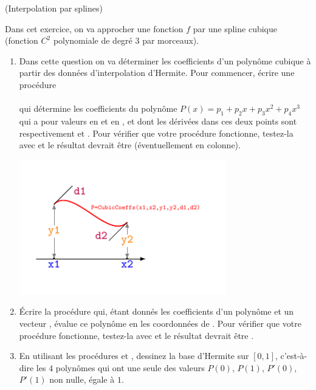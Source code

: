 \documentclass[a4paper,12pt,reqno]{amsart}
\begin{document}
\newpage
\begin{exo} (Interpolation par splines)

  Dans cet exercice, on va approcher une fonction $f$ par une spline cubique (fonction $C^{2}$ polynomiale de degré $3$ par morceaux).
  \begin{enumerate}
    \item Dans cette question on va déterminer les coefficients d'un polynôme cubique à partir des données d'interpolation d'Hermite. Pour commencer, écrire une procédure\\
    \indent {}\\
    qui détermine les coefficients  du polynôme $P(x)= p_{1}+p_{2}x+p_{3}x^{2}+p_{4}x^{3}$ qui a pour valeurs  en  et  en , et dont les dérivées dans ces deux points sont respectivement  et . Pour vérifier que votre procédure fonctionne, testez-la avec  et le résultat devrait être  (éventuellement en colonne).
    \begin{center}
      \includegraphics[width=9cm]{CubbicCoeffs}
    \end{center}

    \item Écrire la procédure  qui, étant donnés les coefficients  d'un polynôme et un vecteur , évalue ce polynôme en les coordonnées de . Pour vérifier que votre procédure fonctionne, testez-la avec  et le résultat devrait être .

    \item En utilisant les procédures  et , dessinez la base d'Hermite sur $[0,1]$, c'est-à-dire les $4$ polynômes qui ont une seule des valeurs $P(0)$, $P(1)$, $P'(0)$, $P'(1)$ non nulle, égale à $1$.


\end{enumerate}
\end{exo}
\end{document}
